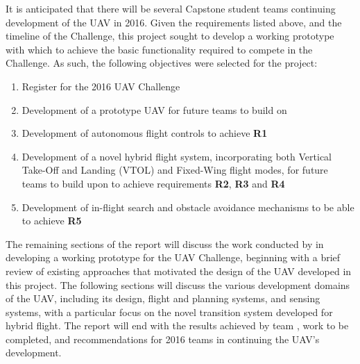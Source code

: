 It is anticipated that there will be several Capstone student teams continuing development of the UAV in 2016. Given the requirements listed above, and the timeline of the Challenge, this project sought to develop a working prototype with which to achieve the basic functionality required to compete in the Challenge. As such, the following objectives were selected for the project:
\begin{enumerate}[label=\bfseries O\arabic*:] \itemsep-2pt
	\item Register for the 2016 UAV Challenge
	\item Development of a prototype UAV for future teams to build on
	\item Development of autonomous flight controls to achieve \textbf{R1}
	\item Development of a novel hybrid flight system, incorporating both Vertical Take-Off and Landing (VTOL) and Fixed-Wing flight modes, for future teams to build upon to achieve requirements \textbf{R2}, \textbf{R3} and \textbf{R4}
	\item Development of in-flight search and obstacle avoidance mechanisms to be able to achieve \textbf{R5}
\end{enumerate}

The remaining sections of the report will discuss the work conducted by \ID in developing a working prototype for the UAV Challenge, beginning with a brief review of existing approaches that motivated the design of the UAV developed in this project. The following sections will discuss the various development domains of the UAV, including its design, flight and planning systems, and sensing systems, with a particular focus on the novel transition system developed for hybrid flight. The report will end with the results achieved by team \ID, work to be completed, and recommendations for 2016 teams in continuing the UAV's development.